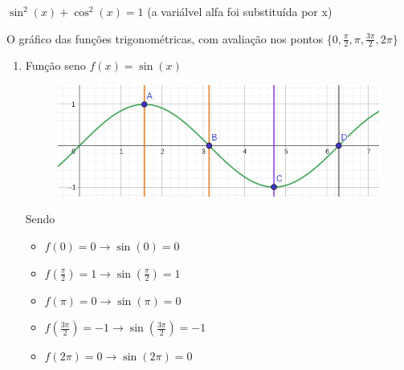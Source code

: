 \begin{multicols*}{2}
    $\sin^2(x) + \cos^2(x) = 1$ (a variálvel alfa foi substituída por x)

    O gráfico das funções trigonométricas, com avaliação nos pontos
    $\Big\{ 0, \frac{\pi}{2}, \pi, \frac{3 \pi}{2}, 2 \pi \Big\}$

    \begin{enumerate}
        \item Função seno $f(x) = \sin(x)$
              \begin{figure}[H]
                  \centering
                  \includegraphics[scale=0.3]{assets/rafael/img33.png}
              \end{figure}
              Sendo
              \begin{itemize}
                  \item $f(0) = 0 \rightarrow \sin(0) = 0 $
                  \item $f\left(\frac{\pi}{2} \right) = 1 \rightarrow \sin \left( \frac{\pi}{2} \right) = 1 $
                  \item $f(\pi) = 0 \rightarrow \sin(\pi) = 0$
                  \item $f\left( \frac{3 \pi}{2} \right) = -1 \rightarrow \sin \left( \frac{3 \pi}{2}\right) = -1$
                  \item $f(2 \pi) = 0 \rightarrow \sin(2 \pi) = 0$
              \end{itemize}


\end{enumerate}
\end{multicols*}
